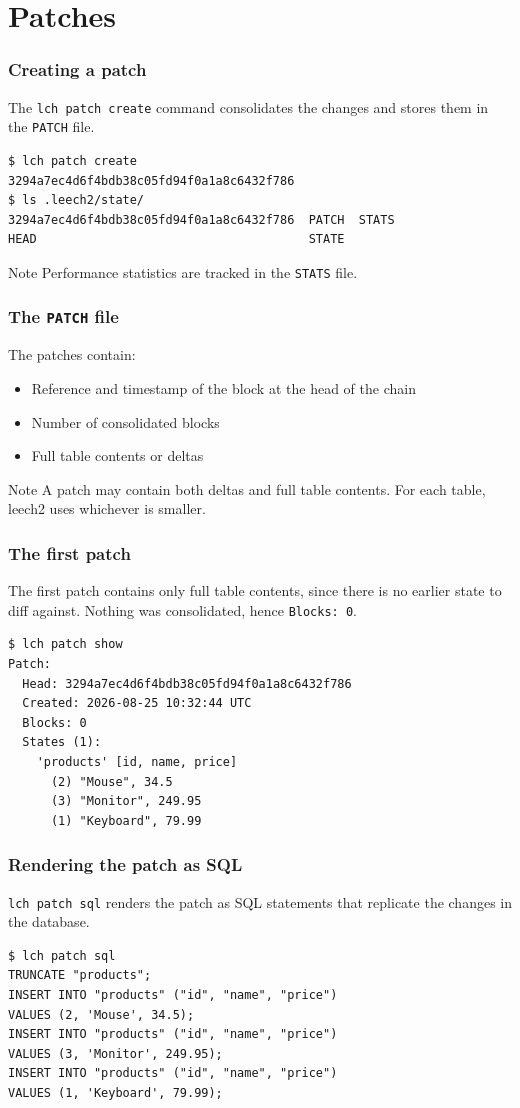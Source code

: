 \documentclass{beamer}
\begin{document}
\section{Patches}

\begin{frame}[fragile]
\frametitle{Creating a patch}
The \texttt{lch patch create} command consolidates the changes and stores them
in the \texttt{PATCH} file.
\begin{verbatim}
$ lch patch create
3294a7ec4d6f4bdb38c05fd94f0a1a8c6432f786
$ ls .leech2/state/
3294a7ec4d6f4bdb38c05fd94f0a1a8c6432f786  PATCH  STATS
HEAD                                      STATE
\end{verbatim}
\begin{block}{Note}
Performance statistics are tracked in the \texttt{STATS} file.
\end{block}
\end{frame}

\begin{frame}
\frametitle{The \texttt{PATCH} file}
The patches contain:
\begin{itemize}
\item Reference and timestamp of the block at the head of the chain
\item Number of consolidated blocks
\item Full table contents or deltas
\end{itemize}
\medskip
\begin{block}{Note}
A patch may contain both deltas and full table contents. For each table, leech2
uses whichever is smaller.
\end{block}
\end{frame}

\begin{frame}[fragile]
\frametitle{The first patch}
The first patch contains only full table contents, since there is no earlier
state to diff against. Nothing was consolidated, hence \texttt{Blocks: 0}.
\begin{verbatim}
$ lch patch show
Patch:
  Head: 3294a7ec4d6f4bdb38c05fd94f0a1a8c6432f786
  Created: 2026-08-25 10:32:44 UTC
  Blocks: 0
  States (1):
    'products' [id, name, price]
      (2) "Mouse", 34.5
      (3) "Monitor", 249.95
      (1) "Keyboard", 79.99
\end{verbatim}
\end{frame}

\begin{frame}[fragile]
\frametitle{Rendering the patch as SQL}
\texttt{lch patch sql} renders the patch as SQL statements that replicate the
changes in the database.
\begin{verbatim}
$ lch patch sql
TRUNCATE "products";
INSERT INTO "products" ("id", "name", "price")
VALUES (2, 'Mouse', 34.5);
INSERT INTO "products" ("id", "name", "price")
VALUES (3, 'Monitor', 249.95);
INSERT INTO "products" ("id", "name", "price")
VALUES (1, 'Keyboard', 79.99);
\end{verbatim}
\end{frame}
\end{document}
